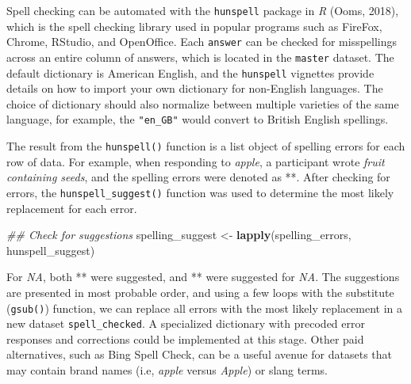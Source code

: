 \documentclass[man]{apa6}
\newenvironment{Shaded}{\begin{snugshade}}{\end{snugshade}}
\newcommand{\CommentTok}[1]{\textcolor[rgb]{0.56,0.35,0.01}{\textit{#1}}}
\newcommand{\DataTypeTok}[1]{\textcolor[rgb]{0.13,0.29,0.53}{#1}}
\newcommand{\KeywordTok}[1]{\textcolor[rgb]{0.13,0.29,0.53}{\textbf{#1}}}
\newcommand{\NormalTok}[1]{#1}
\newcommand{\OperatorTok}[1]{\textcolor[rgb]{0.81,0.36,0.00}{\textbf{#1}}}
\newcommand{\StringTok}[1]{\textcolor[rgb]{0.31,0.60,0.02}{#1}}
\begin{document}
Spell checking can be automated with the \texttt{hunspell} package in \emph{R} (Ooms, 2018), which is the spell checking library used in popular programs such as FireFox, Chrome, RStudio, and OpenOffice. Each \texttt{answer} can be checked for misspellings across an entire column of answers, which is located in the \texttt{master} dataset. The default dictionary is American English, and the \texttt{hunspell} vignettes provide details on how to import your own dictionary for non-English languages. The choice of dictionary should also normalize between multiple varieties of the same language, for example, the \texttt{"en\_GB"} would convert to British English spellings.

\scriptsize

\begin{Shaded}
\end{Shaded}

\normalsize

The result from the \texttt{hunspell()} function is a list object of spelling errors for each row of data. For example, when responding to \emph{apple}, a participant wrote \emph{fruit containing seeds}, and the spelling errors were denoted as **. After checking for errors, the \texttt{hunspell\_suggest()} function was used to determine the most likely replacement for each error.

\scriptsize

\begin{Shaded}
\begin{Highlighting}[]
\CommentTok{## Check for suggestions}
\NormalTok{spelling_suggest <-}\StringTok{ }\KeywordTok{lapply}\NormalTok{(spelling_errors, hunspell_suggest)}
\end{Highlighting}
\end{Shaded}

\normalsize

For \emph{NA}, both ** were suggested, and ** were suggested for \emph{NA}. The suggestions are presented in most probable order, and using a few loops with the substitute (\texttt{gsub()}) function, we can replace all errors with the most likely replacement in a new dataset \texttt{spell\_checked}. A specialized dictionary with precoded error responses and corrections could be implemented at this stage. Other paid alternatives, such as Bing Spell Check, can be a useful avenue for datasets that may contain brand names (i.e, \emph{apple} versus \emph{Apple}) or slang terms.
\end{document}
